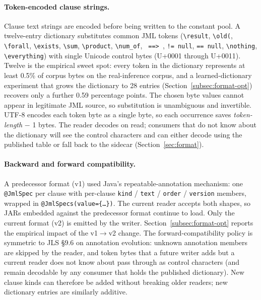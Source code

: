 \paragraph{Token-encoded clause strings.}
Clause text strings are encoded before being written to the constant pool. A twelve-entry dictionary substitutes common JML tokens (\texttt{\textbackslash result}, \texttt{\textbackslash old(}, \texttt{\textbackslash forall}, \texttt{\textbackslash exists}, \texttt{\textbackslash sum}, \texttt{\textbackslash product}, \texttt{\textbackslash num\_of}, \texttt{ ==> }, \texttt{!= null}, \texttt{== null}, \texttt{\textbackslash nothing}, \texttt{\textbackslash everything}) with single Unicode control bytes (U+0001 through U+0011). Twelve is the empirical sweet spot: every token in the dictionary represents at least 0.5\% of corpus bytes on the real-inference corpus, and a learned-dictionary experiment that grows the dictionary to 28 entries (Section~\ref{subsec:format-opt}) recovers only a further 0.59 percentage points. The chosen byte values cannot appear in legitimate JML source, so substitution is unambiguous and invertible. UTF-8 encodes each token byte as a single byte, so each occurrence saves \emph{token-length} $-$ 1 bytes. The reader decodes on read; consumers that do not know about the dictionary will see the control characters and can either decode using the published table or fall back to the sidecar (Section~\ref{sec:format}).

\paragraph{Backward and forward compatibility.}
A predecessor format (v1) used Java's repeatable-annotation mechanism: one \texttt{@JmlSpec} per clause with per-clause \texttt{kind} / \texttt{text} / \texttt{order} / \texttt{version} members, wrapped in \texttt{@JmlSpecs(value=\{\dots\})}. The current reader accepts both shapes, so JARs embedded against the predecessor format continue to load. Only the current format (v2) is emitted by the writer. Section~\ref{subsec:format-opt} reports the empirical impact of the v1$\to$v2 change. The forward-compatibility policy is symmetric to JLS \S9.6 on annotation evolution: unknown annotation members are skipped by the reader, and token bytes that a future writer adds but a current reader does not know about pass through as control characters (and remain decodable by any consumer that holds the published dictionary). New clause kinds can therefore be added without breaking older readers; new dictionary entries are similarly additive.

